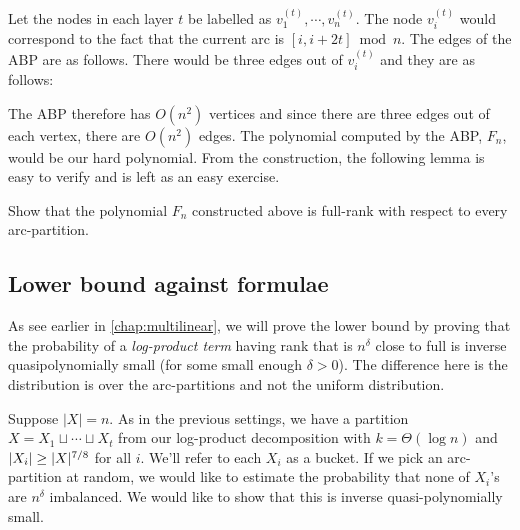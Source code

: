 Let the nodes in each layer $t$ be labelled as $v_1^{(t)},\cdots, v_n^{(t)}$.
The node $v_i^{(t)}$ would correspond to the fact that the current arc is $[i,i+2t] \bmod{n}$.
The edges of the ABP are as follows.
There would be three edges out of $v_i^{(t)}$ and they are as follows:


The ABP therefore has $O(n^2)$ vertices and since there are three edges out of each vertex, there are $O(n^2)$ edges.
The polynomial computed by the ABP, $F_n$, would be our hard polynomial.
From the construction, the following lemma is easy to verify and is left as an easy exercise.

\begin{exercise}
  Show that the polynomial $F_n$ constructed above is full-rank with respect to every arc-partition.
\end{exercise}


\subsection{Lower bound against formulae}

As see earlier in \autoref{chap:multilinear}, we will prove the lower bound by proving that the probability of a \emph{log-product term} having rank that is $n^{\delta}$ close to full is inverse quasipolynomially small (for some small enough $\delta > 0$).
The difference here is the distribution is over the arc-partitions and not the uniform distribution.

Suppose $|X| = n$.
As in the previous settings, we have a partition $X = X_1 \sqcup \cdots \sqcup X_t$ from our log-product decomposition with $k = \Theta(\log n)$ and $\left|X_i\right| \geq |X|^{7/8}$ for all $i$.
We'll refer to each $X_i$ as a bucket.
If we pick an arc-partition at random, we would like to estimate the probability that none of $X_i$'s are $n^\delta$ imbalanced.
We would like to show that this is inverse quasi-polynomially small.

